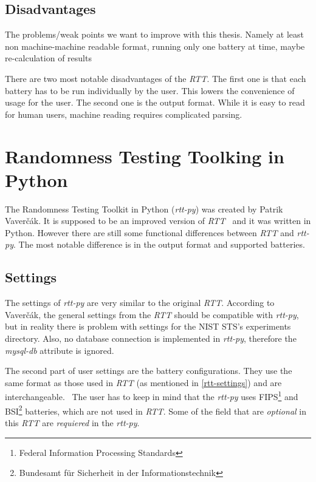 \documentclass[
  digital,     %
  oneside,     %
  nosansbold,  %
  nocolorbold, %
  nolof,         %
  nolot,         %
]{fithesis4}
\begin{document}
\subsection{Disadvantages}
The problems/weak points we want to improve with this thesis. Namely at least non machine-machine readable format, running only one battery at time, maybe re-calculation of results

There are two most notable disadvantages of the \emph{RTT}. The first one is that each battery has to be run individually by the user. This lowers the convenience of usage for the user. The second one is the output format. While it is easy to read for human users, machine reading requires complicated parsing. 



\section{Randomness Testing Toolking in Python}
The Randomness Testing Toolkit in Python (\emph{rtt-py}) was created by Patrik Vaverčák. It is supposed to be an improved version of \emph{RTT}~\cite[p.~24]{vavercak} and it was written in Python. However there are still some functional differences between \emph{RTT} and \emph{rtt-py}. The most notable difference is in the output format and supported batteries.

\subsection{Settings}
The settings of \emph{rtt-py} are very similar to the original \emph{RTT}. According to Vaverčák, the general settings from the \emph{RTT} should be compatible with \emph{rtt-py}, but in reality there is problem with settings for the NIST STS's experiments directory. Also, no database connection is implemented in \emph{rtt-py}, therefore the \emph{mysql-db} attribute is ignored. \cite{rtt-py-github}


The second part of user settings are the battery configurations. They use the same format as those used in \emph{RTT} (as mentioned in \ref{rtt-settings}) and are interchangeable.~\cite[p.~25]{vavercak} The user has to keep in mind that the \emph{rtt-py} uses FIPS\footnote{Federal Information Processing Standards} and BSI\footnote{Bundesamt für Sicherheit in der Informationstechnik} batteries, which are not used in \emph{RTT}. Some of the field that are \emph{optional} in this \emph{RTT} are \emph{requiered} in the \emph{rtt-py}.
\end{document}

